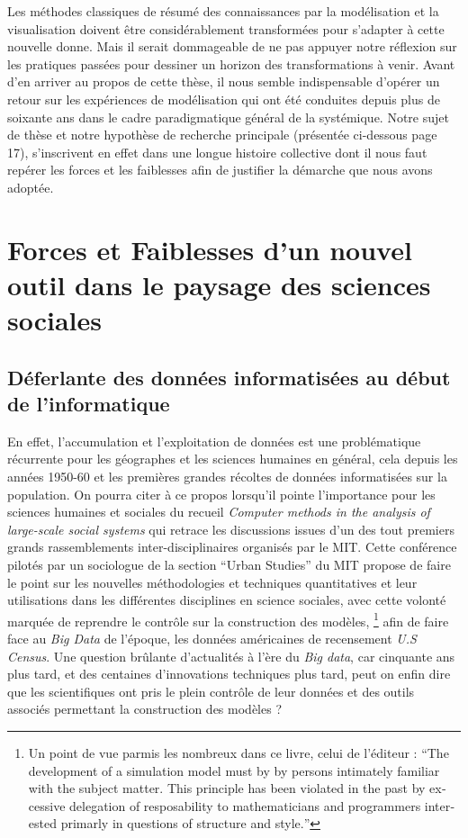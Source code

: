Les méthodes classiques de résumé des connaissances par la modélisation et la visualisation doivent être considérablement transformées pour s’adapter à cette nouvelle donne. Mais il serait dommageable de ne pas appuyer notre réflexion sur les pratiques passées pour dessiner un horizon des transformations à venir. Avant d’en arriver au propos de cette thèse, il nous semble indispensable d’opérer un retour sur les expériences de modélisation qui ont été conduites depuis plus de soixante ans dans le cadre paradigmatique général de la systémique. Notre sujet de thèse et notre hypothèse de recherche principale (présentée ci-dessous page 17), s’inscrivent en effet dans une longue histoire collective dont il nous faut repérer les forces et les faiblesses afin de justifier la démarche que nous avons adoptée. 

\section{Forces et Faiblesses d'un nouvel outil dans le paysage des sciences sociales}

\subsection{Déferlante des données informatisées au début de l'informatique}

En effet, l'accumulation et l'exploitation de données est une problématique récurrente pour les géographes et les sciences humaines en général, cela depuis les années 1950-60 \autocite{Kao1963, Hagerstrand1967b} \autocite[386]{Barnes2011} et les premières grandes récoltes de données informatisées sur la population. On pourra citer à ce propos \textcite{Gullahorn1966} lorsqu'il pointe l'importance pour les sciences humaines et sociales du recueil \textit{Computer methods in the analysis of large-scale social systems} qui retrace les discussions issues d'un des tout premiers grands rassemblements inter-disciplinaires organisés par le MIT. Cette conférence pilotés par un sociologue de la section \foreignquote{english}{Urban Studies} du MIT \autocite{Beshers1965} propose de faire le point sur les nouvelles méthodologies et techniques quantitatives et leur utilisations dans les différentes disciplines en science sociales, avec cette volonté marquée de reprendre le contrôle sur la construction des modèles, \footnote{Un point de vue parmis les nombreux dans ce livre, celui de l'éditeur \textcite[194]{Beshers1965} : \foreignquote{english}{The development of a simulation model must by by persons intimately familiar with the subject matter. This principle has been violated in the past by excessive delegation of resposability to mathematicians and programmers interested primarly in questions of structure and style.} }  afin de faire face au \textit{Big Data} de l'époque, les données américaines de recensement \textit{U.S Census}. Une question brûlante d'actualités à l'ère du \textit{Big data}, car cinquante ans plus tard, et des centaines d'innovations techniques plus tard, peut on enfin dire que les scientifiques ont pris le plein contrôle de leur données et des outils associés permettant la construction des modèles ?


